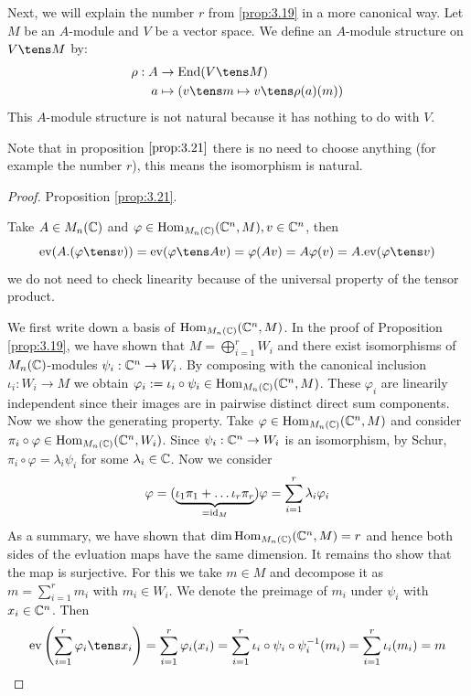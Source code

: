 \documentclass[twoside = false,	%
		headsepline,		%
		parskip = true,
		]{scrbook}						%
\begin{document}
    Next, we will explain the number $r$ from \ref{prop:3.19} in a more canonical way.
    Let $M$ be an $A$-module and $V$ be a vector space. We define an $A$-module structure on $V \tens M$ by:
    \begin{equation*}
    \begin{split}
        \rho: A &\to \End(V \tens M)\\
            a &\mapsto \round{v \tens m \mapsto v \tens \rho(a)(m)}
    \end{split}
    \end{equation*}
    This $A$-module structure is not natural because it has nothing to do with $V$.

    Note that in proposition $\ref{prop:3.21}$ there is no need to choose anything (for example the number $r$), this means the isomorphism is natural.

    \begin{proof}
        Proposition \ref{prop:3.21}.

        Take $A \in M_n(\mathbb C)$ and $\varphi \in \mathrm{Hom}_{M_n(\mathbb C)}(\mathbb C^n, M), v \in \mathbb C^n$, then
        \begin{equation*}
            \ev(A.(\varphi \tens v)) = \ev(\varphi \tens Av) = \varphi(Av) = A \varphi(v) = A.\ev(\varphi \tens v)
        \end{equation*}
        we do not need to check linearity because of the universal property of the tensor product.

        We first write down a basis of $\mathrm{Hom}_{M_n(\mathbb C)}(\mathbb C^n,M)$. In the proof of Proposition \ref{prop:3.19}, we have shown that $M = \bigoplus_{i=1}^r W_i$ and there exist isomorphisms of $M_n(\mathbb C)$-modules $\psi_i:\mathbb C^n \to W_i$. By composing with the canonical inclusion $\iota_i: W_i \to M$ we obtain $\varphi_i:= \iota_i \circ \psi_i \in \mathrm{Hom}_{M_n(\mathbb C)}(\mathbb C^n,M)$. These $\varphi_i$ are linearily independent since their images are in pairwise distinct direct sum components.
        Now we show the generating property. Take $\varphi \in \mathrm{Hom}_{M_n(\mathbb C)}(\mathbb C^n,M)$ and consider $\pi_i \circ \varphi \in \mathrm{Hom}_{M_n(\mathbb C)}(\mathbb C^n,W_i)$. Since $\psi_i: \mathbb C^n \to W_i$ is an isomorphism, by Schur, $\pi_i \circ \varphi = \lambda_i \psi_i$ for some $\lambda_i \in \mathbb C$. Now we consider
        \begin{equation*}
            \varphi = (\underbrace{\iota_1\pi_1 + \dots \iota_r \pi_r}_{=\mathrm{id}_M})\varphi = \sum_{i=1}^r \lambda_i \varphi_i
        \end{equation*}
        As a summary, we have shown that $\dim \mathrm{Hom}_{M_n(\mathbb C)}(\mathbb C^n,M) = r$ and hence both sides of the evluation maps have the same dimension. It remains tho show that the map is surjective. For this we take $m \in M$ and decompose it as $m = \sum_{i=1}^r m_i$ with $m_i \in W_i$. We denote the preimage of $m_i$ under $\psi_i$ with $x_i \in \mathbb C^n$. Then
        \begin{equation*}
            \ev \round{\sum_{i=1}^r \varphi_i \tens x_i} = \sum_{i=1}^r \varphi_i(x_i) = \sum_{i=1}^r \iota_i \circ \psi_i \circ \psi_i^{-1}(m_i) = \sum_{i=1}^r \iota_i(m_i) = m
        \end{equation*}
    \end{proof}
\end{document}
